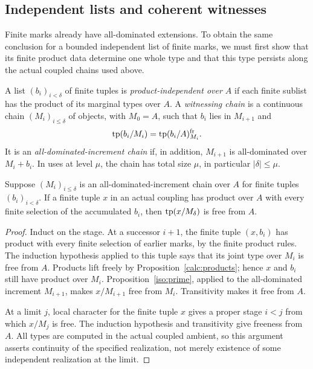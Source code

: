 \subsection{Independent lists and coherent witnesses}

Finite marks already have all-dominated extensions.  To obtain the same
conclusion for a bounded independent list of finite marks, we must first
show that its finite product data determine one whole type and that this
type persists along the actual coupled chains used above.

\begin{definition}\label{iso:independent-definition}
A list $(b_i)_{i<\delta}$ of finite tuples is
\emph{product-independent over $A$} if each finite sublist has the
product of its marginal types over $A$.
A \emph{witnessing chain} is a continuous chain $(M_i)_{i\leq\delta}$
of objects, with $M_0=A$, such that $b_i$ lies in $M_{i+1}$ and
\[
 \operatorname{tp}(b_i/M_i)=\operatorname{tp}(b_i/A)^{\mathrm{fr}}_{M_i}.
\]
It is an \emph{all-dominated-increment chain} if, in addition,
$M_{i+1}$ is all-dominated over $M_i+b_i$. In uses at level $\mu$,
the chain has total size $\mu$, in particular $|\delta|\leq\mu$.
\end{definition}

\begin{lemma}\label{iso:finite-domination}
Suppose $(M_i)_{i\leq\delta}$ is an all-dominated-increment chain over
$A$ for finite tuples $(b_i)_{i<\delta}$. If a finite tuple $x$ in an
actual coupling has product over $A$ with every finite selection of
the accumulated $b_i$, then $\operatorname{tp}(x/M_\delta)$ is free from $A$.
\end{lemma}

\begin{proof}
Induct on the stage. At a successor $i+1$, the finite tuple $(x,b_i)$
has product with every finite selection of earlier marks, by the
finite product rules. The induction hypothesis applied to this tuple
says that its joint type over $M_i$ is free from $A$. Products lift
freely by Proposition~\ref{calc:products}; hence $x$ and $b_i$ still have
product over $M_i$. Proposition~\ref{iso:prime}, applied to the
all-dominated increment $M_{i+1}$, makes $x/M_{i+1}$ free from $M_i$.
Transitivity makes it free from $A$.

At a limit $j$, local character for the finite tuple $x$ gives a
proper stage $i<j$ from which $x/M_j$ is free. The induction
hypothesis and transitivity give freeness from $A$. All types are
computed in the actual coupled ambient, so this argument asserts
continuity of the specified realization, not merely existence of
some independent realization at the limit.
\end{proof}

